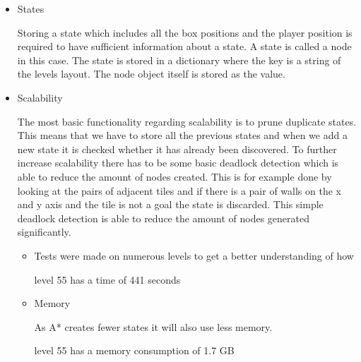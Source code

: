 \documentclass[../../maint.tex]{subfiles}
\begin{document}
\begin{itemize}
	\item States
	
	Storing a state which includes all the box positions and the player position is required to have sufficient information about a state. A state is called a node in this case.
	The state is stored in a dictionary where the key is a string of the levels layout. The node object itself is stored as the value.
	
	\item Scalability
	
	The most basic functionality regarding scalability is to prune duplicate states. This means that we have to store all the previous states and when we add a new state it is checked whether it has already been discovered.
	To further increase scalability there has to be some basic deadlock detection which is able to reduce the amount of nodes created. This is for example done by looking at the pairs of adjacent tiles and if there is a pair of walls on the x and y axis and the tile is not a goal the state is discarded. This simple deadlock detection is able to reduce the amount of nodes generated significantly.
	
 	\begin{itemize}
 		\item
 		
 		Tests were made on numerous levels to get a better understanding of how 
 		
 		level 55 has a time of 441 seconds
 		
		\item Memory
		
		As A* creates fewer states it will also use less memory. 
		
		level 55 has a memory consumption of 1.7 GB
		
 	\end{itemize}
\end{itemize}
	
\end{document}
